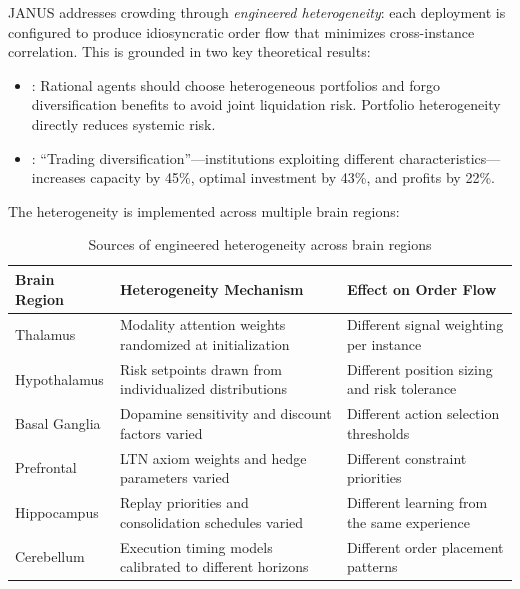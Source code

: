 \documentclass[12pt, a4paper]{article}
\begin{document}
JANUS addresses crowding through \textit{engineered heterogeneity}: each deployment is configured to produce idiosyncratic order flow that minimizes cross-instance correlation. This is grounded in two key theoretical results:

\begin{itemize}
	\item \citet{wagner2011diversity}: Rational agents should choose heterogeneous portfolios and forgo diversification benefits to avoid joint liquidation risk. Portfolio heterogeneity directly reduces systemic risk.
	\item \citet{demiguel2021crowding}: ``Trading diversification''---institutions exploiting different characteristics---increases capacity by 45\%, optimal investment by 43\%, and profits by 22\%.
\end{itemize}

The heterogeneity is implemented across multiple brain regions:

\begin{table}[htbp]
	\centering
	\caption{Sources of engineered heterogeneity across brain regions}
	\label{tab:heterogeneity}
	\begin{tabularx}{\textwidth}{|l|L|L|}
		\hline
		\textbf{Brain Region} & \textbf{Heterogeneity Mechanism}                         & \textbf{Effect on Order Flow}                \\
		\hline
		Thalamus              & Modality attention weights randomized at initialization  & Different signal weighting per instance      \\
		\hline
		Hypothalamus          & Risk setpoints drawn from individualized distributions   & Different position sizing and risk tolerance \\
		\hline
		Basal Ganglia         & Dopamine sensitivity and discount factors varied         & Different action selection thresholds        \\
		\hline
		Prefrontal            & LTN axiom weights and hedge parameters varied            & Different constraint priorities              \\
		\hline
		Hippocampus           & Replay priorities and consolidation schedules varied     & Different learning from the same experience  \\
		\hline
		Cerebellum            & Execution timing models calibrated to different horizons & Different order placement patterns           \\
		\hline
	\end{tabularx}
\end{table}
\end{document}
